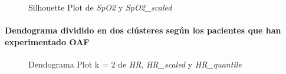 \begin{figure}[ht]
    \centering
    \hfill
    \caption{Silhouette Plot de \textit{SpO2} y \textit{SpO2\_scaled}}\label{fig:per_si_spo2}
\end{figure}

\paragraph{Dendograma dividido en dos clústeres según los pacientes que han experimentado OAF}

\begin{figure}[H]
    \centering
    \caption{Dendograma Plot k = 2 de \textit{HR}, \textit{HR\_scaled} y \textit{HR\_quantile}}\label{fig:per_ctg_fc}
\end{figure}


